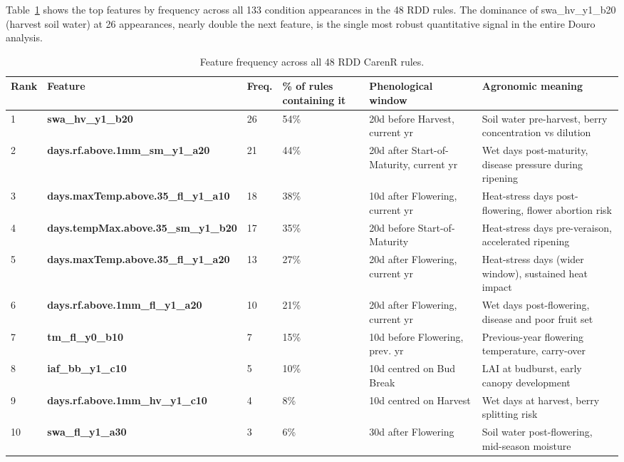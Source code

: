 Table~\ref{tab:ch4b_1} shows the top features by frequency across all 133 condition appearances in the 48 RDD rules. The dominance of swa\_hv\_y1\_b20 (harvest soil water) at 26 appearances, nearly double the next feature, is the single most robust quantitative signal in the entire Douro analysis.

\begin{table}[!ht]
  \centering
  \caption{Feature frequency across all 48 RDD CarenR rules.}\label{tab:ch4b_1}
  \footnotesize
  \begin{adjustbox}{max width=\textwidth}
    \begin{tabularx}{\textwidth}{p{0.5cm}|p{3.6cm}|p{1.1cm}|p{1.2cm}|p{2.4cm}|X}
  \toprule
  Rank & Feature & Freq. & \% of rules
containing it & Phenological window & Agronomic meaning \\
  \midrule
  1 & \textbf{swa\_hv\_y1\_b20} & 26 & 54\% & 20d before Harvest, current yr & Soil water pre-harvest, berry concentration vs dilution \\
  2 & \textbf{days.rf.above.1mm\_sm\_y1\_a20} & 21 & 44\% & 20d after Start-of-Maturity, current yr & Wet days post-maturity, disease pressure during ripening \\
  3 & \textbf{days.maxTemp.above.35\_fl\_y1\_a10} & 18 & 38\% & 10d after Flowering, current yr & Heat-stress days post-flowering, flower abortion risk \\
  4 & \textbf{days.tempMax.above.35\_sm\_y1\_b20} & 17 & 35\% & 20d before Start-of-Maturity & Heat-stress days pre-veraison, accelerated ripening \\
  5 & \textbf{days.maxTemp.above.35\_fl\_y1\_a20} & 13 & 27\% & 20d after Flowering, current yr & Heat-stress days (wider window), sustained heat impact \\
  6 & \textbf{days.rf.above.1mm\_fl\_y1\_a20} & 10 & 21\% & 20d after Flowering, current yr & Wet days post-flowering, disease and poor fruit set \\
  7 & \textbf{tm\_fl\_y0\_b10} & 7 & 15\% & 10d before Flowering, prev. yr & Previous-year flowering temperature, carry-over \\
  8 & \textbf{iaf\_bb\_y1\_c10} & 5 & 10\% & 10d centred on Bud Break & LAI at budburst, early canopy development \\
  9 & \textbf{days.rf.above.1mm\_hv\_y1\_c10} & 4 & 8\% & 10d centred on Harvest & Wet days at harvest, berry splitting risk \\
  10 & \textbf{swa\_fl\_y1\_a30} & 3 & 6\% & 30d after Flowering & Soil water post-flowering, mid-season moisture \\
  \bottomrule
\end{tabularx}
  \end{adjustbox}

\end{table}



